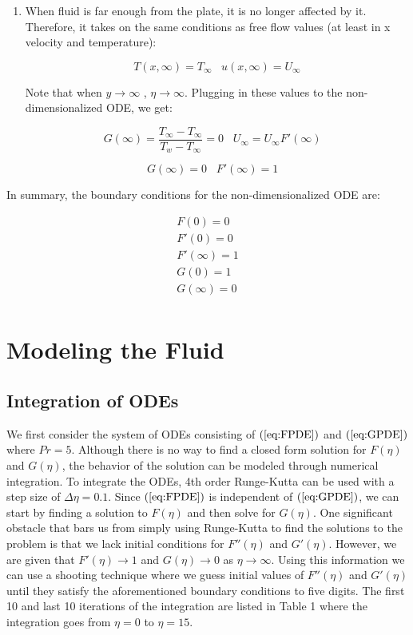 \documentclass[12pt]{article}\pagestyle{myheadings}
\theoremstyle{plain}
\begin{document}
\begin{enumerate}
\item When fluid is far enough from the plate, it is no longer affected by it. Therefore, it takes on the same conditions as free flow values (at least in x velocity and temperature):

\begin{equation}\label{eq:farFromPlate}
T(x,\infty) = T_{\infty}   \,\,\,\,\,  u(x,\infty) = U_{\infty} 
\end{equation}

Note that when $y \rightarrow \infty$ , $\eta \rightarrow \infty$. Plugging in these values to the non-dimensionalized ODE, we get:

\[
G(\infty) = \frac{T_{\infty}-T_{\infty}}{T_{w}-T_{\infty}} = 0   \,\,\,\,\,  U_{\infty} = U_{\infty} F'(\infty)    \,\,\,\,\, 
\]

\begin{equation}
G(\infty) = 0   \,\,\,\,\,  F'(\infty) = 1   \,\,\,\,\, 
\end{equation}

\end{enumerate}

In summary, the boundary conditions for the non-dimensionalized ODE are:

\begin{eqnarray*} 
F(0) = 0 \\
F'(0) = 0 \\ 
F'(\infty) = 1 \\
G(0) = 1 \\
G(\infty) = 0 \\
\end{eqnarray*}

\section{Modeling the Fluid}
\subsection{Integration of ODEs}
We first consider the system of ODEs consisting of $(\ref{eq:FPDE})$ and $(\ref{eq:GPDE})$ where $Pr = 5$. Although there is no way to find a closed form solution for $F(\eta)$ and $G(\eta)$, the behavior of the solution can be modeled through numerical integration. To integrate the ODEs, 4th order Runge-Kutta can be used with a step size of $\Delta \eta= 0.1$. Since $(\ref{eq:FPDE})$ is independent of $(\ref{eq:GPDE})$, we can start by finding a solution to $F(\eta)$ and then solve for $G(\eta)$. One significant obstacle that bars us from simply using Runge-Kutta to find the solutions to the problem is that we lack initial conditions for $F''(\eta)$ and $G'(\eta)$. However, we are given that $F'(\eta) \rightarrow 1$ and $G(\eta) \rightarrow 0$ as $\eta \rightarrow \infty$. Using this information we can use a shooting technique where we guess initial values of $F''(\eta)$ and $G'(\eta)$ until they satisfy the aforementioned boundary conditions to five digits. The first 10 and last 10 iterations of the integration are listed in Table 1 where the integration goes from $\eta = 0$ to $\eta = 15$. 
\end{document}
